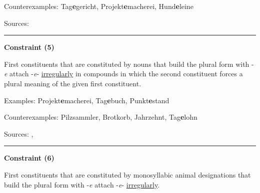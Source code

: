 \noindent
Counterexamples: Tag\textbf{e}gericht, Projekt\textbf{e}macherei, Hund\textbf{e}leine

\vspace{0.3em}

\noindent
Sources: \citet[83]{ortner_mueller-bollhagen_1991}


\hrule




\vspace{0.4em}

\begin{center}
\textbf{Constraint (5)}
\end{center}

\noindent
First constituents that are constituted by nouns that build the plural form with -\textit{e} attach -\textit{e}- \underline{irregularly} in compounds in which the second constituent forces a plural meaning of the given first constituent.
\vspace{0.35em}


\vspace{0.3em}

\noindent
Examples: Projekt\textbf{e}macherei, Tag\textbf{e}buch, Punkt\textbf{e}stand

\noindent
Counterexamples: Pilz{\zeroLinker}sammler, Brot{\zeroLinker}korb, Jahr{\zeroLinker}zehnt, Tag\textbf{e}lohn

\vspace{0.3em}

\noindent
Sources: \citet[103]{ortner_mueller-bollhagen_1991}, \citet[29]{schaefer_pankratz_2018}


\hrule




\vspace{0.4em}

\begin{center}
\textbf{Constraint (6)}
\end{center}

\noindent
First constituents that are constituted by monosyllabic animal designations that build the plural form with -\textit{e} attach -\textit{e}- \underline{irregularly}.
\vspace{0.35em}

